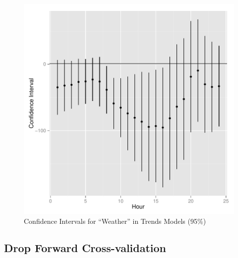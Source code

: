 \documentclass{article}
\begin{document}
\begin{figure}
\begin{center}
\caption{Confidence Intervals for ``Weather'' in Trends Models (95\%)}
\includegraphics{DraftPaper-009}
\end{center}
\end{figure}



  






  \subsection{Drop Forward Cross-validation}
\end{document}
